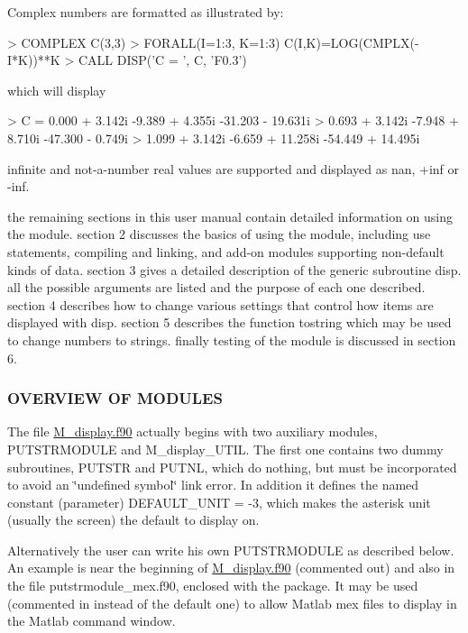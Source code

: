 Complex numbers are formatted as illustrated by\+: \begin{DoxyVerb} > COMPLEX C(3,3)
 > FORALL(I=1:3, K=1:3) C(I,K)=LOG(CMPLX(-I*K))**K
 > CALL DISP('C = ', C, 'F0.3')
\end{DoxyVerb}


which will display \begin{DoxyVerb} > C = 0.000 + 3.142i   -9.389 +  4.355i   -31.203 - 19.631i
 >     0.693 + 3.142i   -7.948 +  8.710i   -47.300 -  0.749i
 >     1.099 + 3.142i   -6.659 + 11.258i   -54.449 + 14.495i
\end{DoxyVerb}


infinite and not-\/a-\/number real values are supported and displayed as nan, +inf or -\/inf.

the remaining sections in this user manual contain detailed information on using the module. section 2 discusses the basics of using the module, including use statements, compiling and linking, and add-\/on modules supporting non-\/default kinds of data. section 3 gives a detailed description of the generic subroutine disp. all the possible arguments are listed and the purpose of each one described. section 4 describes how to change various settings that control how items are displayed with disp. section 5 describes the function tostring which may be used to change numbers to strings. finally testing of the module is discussed in section 6.

\subsubsection*{O\+V\+E\+R\+V\+I\+EW OF M\+O\+D\+U\+L\+ES}

The file \hyperlink{M__display_8f90}{M\+\_\+display.\+f90} actually begins with two auxiliary modules, P\+U\+T\+S\+T\+R\+M\+O\+D\+U\+LE and M\+\_\+display\+\_\+\+U\+T\+IL. The first one contains two dummy subroutines, P\+U\+T\+S\+TR and P\+U\+T\+NL, which do nothing, but must be incorporated to avoid an \char`\"{}undefined symbol\char`\"{} link error. In addition it defines the named constant (parameter) D\+E\+F\+A\+U\+L\+T\+\_\+\+U\+N\+IT = -\/3, which makes the asterisk unit (usually the screen) the default to display on.

Alternatively the user can write his own P\+U\+T\+S\+T\+R\+M\+O\+D\+U\+LE as described below. An example is near the beginning of \hyperlink{M__display_8f90}{M\+\_\+display.\+f90} (commented out) and also in the file putstrmodule\+\_\+mex.\+f90, enclosed with the package. It may be used (commented in instead of the default one) to allow Matlab mex files to display in the Matlab command window.

